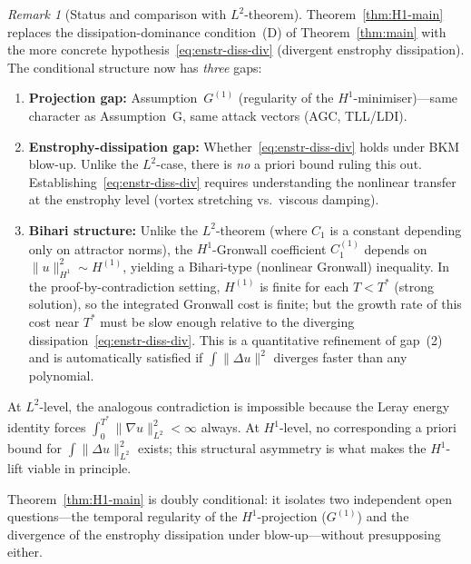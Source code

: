 \documentclass[12pt,a4paper]{article}
\theoremstyle{definition}
\theoremstyle{plain}
\theoremstyle{remark}
\newtheorem{remark}[definition]{Remark}
\begin{document}
\begin{remark}[Status and comparison with $L^2$-theorem]
\label{rem:H1-comparison}
Theorem~\ref{thm:H1-main} replaces the dissipation-dominance
condition~(D) of Theorem~\ref{thm:main} with the more concrete
hypothesis~\eqref{eq:enstr-diss-div} (divergent enstrophy
dissipation).  The conditional structure now has \emph{three} gaps:
\begin{enumerate}
  \item \textbf{Projection gap:}\; Assumption~$G^{(1)}$
    (regularity of the $H^1$-minimiser)---same character as
    Assumption~G, same attack vectors (AGC, TLL/LDI).
  \item \textbf{Enstrophy-dissipation gap:}\;
    Whether~\eqref{eq:enstr-diss-div} holds under BKM blow-up.
    Unlike the $L^2$-case, there is \emph{no} a priori bound
    ruling this out.  Establishing~\eqref{eq:enstr-diss-div}
    requires understanding the nonlinear transfer at the
    enstrophy level (vortex stretching vs.\ viscous damping).
  \item \textbf{Bihari structure:}\;
    Unlike the $L^2$-theorem (where $C_1$ is a constant
    depending only on attractor norms), the $H^1$-Gronwall
    coefficient $C_1^{(1)}$ depends on $\|u\|_{H^1}^2 \sim H^{(1)}$,
    yielding a Bihari-type (nonlinear Gronwall) inequality.
    In the proof-by-contradiction setting, $H^{(1)}$ is finite
    for each $T < T^*$ (strong solution), so the integrated
    Gronwall cost is finite; but the growth rate of this cost
    near $T^*$ must be slow enough relative to the diverging
    dissipation~\eqref{eq:enstr-diss-div}.  This is a quantitative
    refinement of gap~(2) and is automatically satisfied if
    $\int\|\Delta u\|^2$ diverges faster than any polynomial.
\end{enumerate}
At $L^2$-level, the analogous contradiction is impossible because
the Leray energy identity forces
$\int_0^{T^*}\|\nabla u\|_{L^2}^2 < \infty$ always.
At $H^1$-level, no corresponding a priori bound for
$\int\|\Delta u\|_{L^2}^2$ exists; this structural asymmetry
is what makes the $H^1$-lift viable in principle.

Theorem~\ref{thm:H1-main} is doubly conditional: it isolates
two independent open questions---the temporal regularity of the
$H^1$-projection ($G^{(1)}$) and the divergence of the enstrophy
dissipation under blow-up---without presupposing either.


\end{remark}
\end{document}
